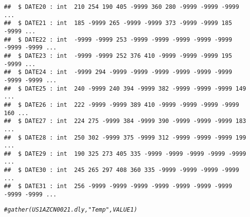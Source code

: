 \documentclass{article}\usepackage[]{graphicx}\usepackage[]{color}
\makeatletter
\newcommand{\hlcom}[1]{\textcolor[rgb]{0.678,0.584,0.686}{\textit{#1}}}%
\newenvironment{kframe}{%
 \def\at@end@of@kframe{}%
 \ifinner\ifhmode%
  \def\at@end@of@kframe{\end{minipage}}%
  \begin{minipage}{\columnwidth}%
 \fi\fi%
 \def\FrameCommand##1{\hskip\@totalleftmargin \hskip-\fboxsep
 \colorbox{shadecolor}{##1}\hskip-\fboxsep
     \hskip-\linewidth \hskip-\@totalleftmargin \hskip\columnwidth}%
 \MakeFramed {\advance\hsize-\width
   \@totalleftmargin\z@ \linewidth\hsize
   \@setminipage}}%
 {\par\unskip\endMakeFramed%
 \at@end@of@kframe}
\newenvironment{knitrout}{}{} %
\makeatother
\begin{document}
\begin{knitrout}
\begin{kframe}
\begin{verbatim}
##  $ DATE20 : int  210 254 190 405 -9999 360 280 -9999 -9999 -9999 ...
##  $ DATE21 : int  185 -9999 265 -9999 -9999 373 -9999 -9999 185 -9999 ...
##  $ DATE22 : int  -9999 -9999 253 -9999 -9999 -9999 -9999 -9999 -9999 -9999 ...
##  $ DATE23 : int  -9999 -9999 252 376 410 -9999 -9999 -9999 195 -9999 ...
##  $ DATE24 : int  -9999 294 -9999 -9999 -9999 -9999 -9999 -9999 -9999 -9999 ...
##  $ DATE25 : int  240 -9999 240 394 -9999 382 -9999 -9999 -9999 149 ...
##  $ DATE26 : int  222 -9999 -9999 389 410 -9999 -9999 -9999 -9999 160 ...
##  $ DATE27 : int  224 275 -9999 384 -9999 390 -9999 -9999 -9999 183 ...
##  $ DATE28 : int  250 302 -9999 375 -9999 312 -9999 -9999 -9999 199 ...
##  $ DATE29 : int  190 325 273 405 335 -9999 -9999 -9999 -9999 -9999 ...
##  $ DATE30 : int  245 265 297 408 360 335 -9999 -9999 -9999 -9999 ...
##  $ DATE31 : int  256 -9999 -9999 -9999 -9999 -9999 -9999 -9999 -9999 -9999 ...
\end{verbatim}
\begin{alltt}
\hlcom{#gather(US1AZCN0021.dly, "Temp", VALUE1)}


\end{alltt}
\end{kframe}
\end{knitrout}
\end{document}
